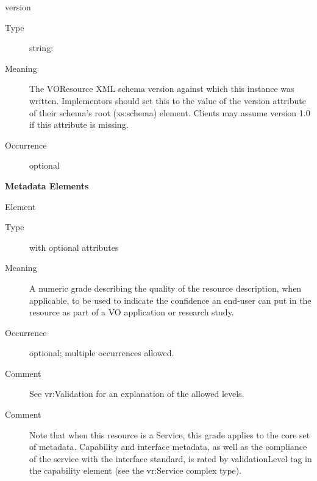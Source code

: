 \documentclass[11pt,a4paper]{ivoa}
\begin{document}
\begin{generated}
\begin{bigdescription}
\begin{description}
\begin{longtermsdescription}
\end{longtermsdescription}
\end{description}
\item[version]
\begin{description}
\item[Type] string: 
\item[Meaning] 
               The VOResource XML schema version 
               against which this instance was written.
               Implementors should set this to the value of the version
               attribute of their schema's root (xs:schema) element.
               Clients may assume version 1.0 if this attribute is 
               missing.
            
\item[Occurrence] optional
\end{description}


\end{bigdescription}\endgroup



\vspace{0.5ex}\noindent\textbf{ Metadata Elements}

\begingroup\small\begin{bigdescription}\item[Element \xmlel{validationLevel}]
\begin{description}
\item[Type]  with optional attributes
\item[Meaning] 
                  A numeric grade describing the quality of the
                  resource description, when applicable, 
                  to be used to indicate the confidence an end-user
                  can put in the resource as part of a VO application
                  or research study. 
               
\item[Occurrence] optional; multiple occurrences allowed.
\item[Comment] 
                  See vr:Validation for an explanation of the
                  allowed levels.  
               
\item[Comment] 
                  Note that when this resource is a Service, this
                  grade applies to the core set of metadata.
                  Capability and interface metadata, as well as the
                  compliance of the service with the interface
                  standard, is rated by validationLevel tag in the 
                  capability element (see the vr:Service complex
                  type).  
               


\end{description}
\end{bigdescription}
\end{generated}
\end{document}
